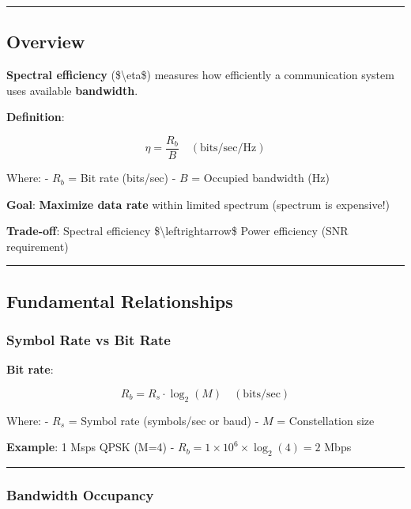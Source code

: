 \begin{center}\rule{0.5\linewidth}{0.5pt}\end{center}

\subsection{Overview}\label{overview}

\textbf{Spectral efficiency} (\$\textbackslash eta\$) measures how
efficiently a communication system uses available \textbf{bandwidth}.

\textbf{Definition}:

\[
\eta = \frac{R_b}{B} \quad (\text{bits/sec/Hz})
\]

Where: - \(R_b\) = Bit rate (bits/sec) - \(B\) = Occupied bandwidth (Hz)

\textbf{Goal}: \textbf{Maximize data rate} within limited spectrum
(spectrum is expensive!)

\textbf{Trade-off}: Spectral efficiency
\$\textbackslash leftrightarrow\$ Power efficiency (SNR requirement)

\begin{center}\rule{0.5\linewidth}{0.5pt}\end{center}

\subsection{Fundamental Relationships}\label{fundamental-relationships}

\subsubsection{Symbol Rate vs Bit Rate}\label{symbol-rate-vs-bit-rate}

\textbf{Bit rate}:

\[
R_b = R_s \cdot \log_2(M) \quad (\text{bits/sec})
\]

Where: - \(R_s\) = Symbol rate (symbols/sec or baud) - \(M\) =
Constellation size

\textbf{Example}: 1 Msps QPSK (M=4) -
\(R_b = 1 \times 10^6 \times \log_2(4) = 2\) Mbps

\begin{center}\rule{0.5\linewidth}{0.5pt}\end{center}

\subsubsection{Bandwidth Occupancy}\label{bandwidth-occupancy}


